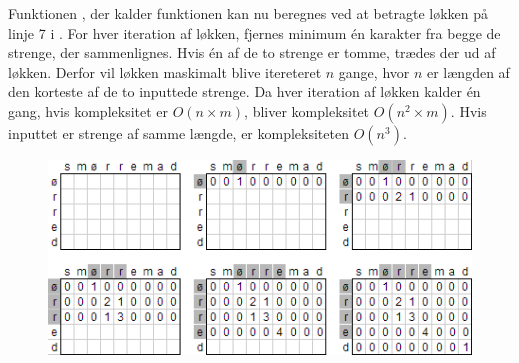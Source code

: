 Funktionen , der kalder funktionen  kan nu beregnes ved at betragte løkken på linje 7 i . For hver iteration af løkken, fjernes minimum én karakter fra begge de strenge, der sammenlignes. Hvis én af de to strenge er tomme, trædes der ud af løkken. Derfor vil løkken maskimalt blive itereteret $n$ gange, hvor $n$ er længden af den korteste af de to inputtede strenge.
Da hver iteration af løkken kalder  én gang, hvis kompleksitet er $O(n \times m)$, bliver  kompleksitet $O(n^2 \times m)$. Hvis inputtet er strenge af samme længde, er kompleksiteten $O(n^3)$.
\begin{figure}
\centering
\includegraphics[scale=1]{billeder/longest-common-substring.png}
  \label{fig:longest-common-substring}
\end{figure}

